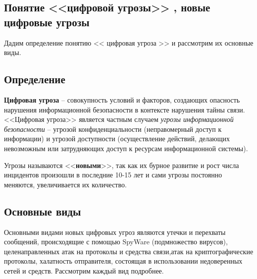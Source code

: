 \parindent=1cm %
\begin{center}
	
	\section{Понятие <<цифровой угрозы>> , новые цифровые угрозы}
	
\end{center}

Дадим определение понятию << цифровая угроза >> и рассмотрим их основные виды.
\subsection{Определение}


	\textbf{Цифровая угроза} -- совокупность условий и факторов, создающих опасность нарушения информационной безопасности  в контексте нарушения тайны связи.%
<<Цифровая угроза>> является частным случаем \textit{угрозы информационной безопасности} -- угрозой конфиденциальности (неправомерный доступ к информации) и угрозой доступности (осуществление действий, делающих невозможным или затрудняющих доступ к ресурсам информационной системы). 

Угрозы называются <<\textbf{новыми}>>, так как их бурное развитие и рост числа инцидентов произошли в последние 10-15 лет и сами угрозы постоянно меняются, увеличивается их количество.  

\subsection{Основные виды}

	Основными видами новых цифровых  угроз являются  утечки и перехваты сообщений, происходящие с помощью  SpyWare (подмножество вирусов),  целенаправленных атак  на протоколы и средства связи,атак на криптографические протоколы, халатность отправителя, состоящая в использовании недоверенных  сетей и средств. Рассмотрим каждый вид  подробнее.
	
